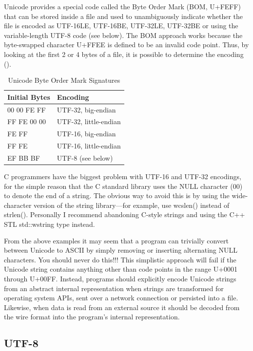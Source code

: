 Unicode provides a special code called the Byte Order Mark (BOM, U+FEFF) that can be stored inside a file and used to unambiguously indicate whether the file is encoded as UTF-16LE, UTF-16BE, UTF-32LE, UTF-32BE or using the variable-length UTF-8 code (see below). The BOM approach works because the byte-swapped character U+FFEE is defined to be an invalid code point. Thus, by looking at the first 2 or 4 bytes of a  file, it is possible to determine the encoding ().

\begin{table}
\begin{tabular}{ll}
	Initial Bytes		&Encoding \\ 
\hline
	00 00 FE FF &       UTF-32, big-endian\\
	FF FE 00 00 &       UTF-32, little-endian\\
	FE FF       &       UTF-16, big-endian\\
	FF FE       &      UTF-16, little-endian\\
	EF BB BF    &      UTF-8 (see below)\\
\end{tabular}
\caption{Unicode Byte Order Mark Signatures}\label{unicode-bom}
\end{table}

C programmers have the biggest problem with UTF-16 and UTF-32 encodings, for the simple reason that the C standard library uses the NULL character (00) to denote the end of a string. The obvious way to avoid this is by using the wide-character version of the string library---for example, use wcslen() instead of strlen().  Personally I recommend abandoning C-style strings and using the C++ STL std::wstring type instead.

From the above examples it may seem that a program can trivially convert between Unicode to ASCII by simply removing or inserting alternating NULL characters. You should never do this!!!  This simplistic approach will fail if the Unicode string contains anything other than code points in the range U+0001 through U+00FF. Instead, programs should explicitly encode Unicode strings from an abstract internal representation when strings are transformed for operating system APIs, sent over a network connection or persisted into a file. Likewise, when data is read from an external source it should be decoded from the wire format into the program's internal representation.


\subsection{UTF-8}

